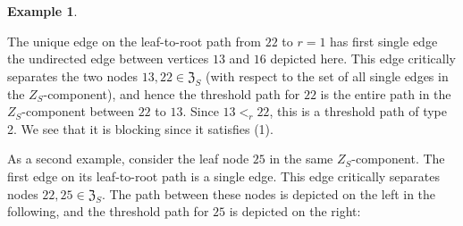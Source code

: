 \documentclass[11pt]{article}
\theoremstyle{definition}
\newtheorem{example}[theo]{Example}
\numberwithin{equation}{section}
\begin{document}
\begin{example}
\begin{center}
    \end{center}
    The unique edge on the leaf-to-root path from $22$ to $r = 1$ has first single edge the undirected edge between vertices $13$ and $16$ depicted here.  
    This edge critically separates the two nodes $13, 22\in\mathfrak{Z}_S$ (with respect to the set of all single edges in the $Z_S$-component), and hence the threshold path for $22$ is the entire path in the $Z_S$-component between $22$ to $13$. 
    Since $13 <_r 22$, this is a threshold path of type 2. 
    We see that it is blocking since it satisfies (1).  

    As a second example, consider the leaf node $25$ in the same $Z_S$-component.  The first edge on its leaf-to-root path is a single edge.  This edge critically separates nodes $22, 25\in\mathfrak{Z}_S$.  The path between these nodes is depicted on the left in the following, and the threshold path for $25$ is depicted on the right:
    \begin{center}
\end{center}
\end{example}
\end{document}
